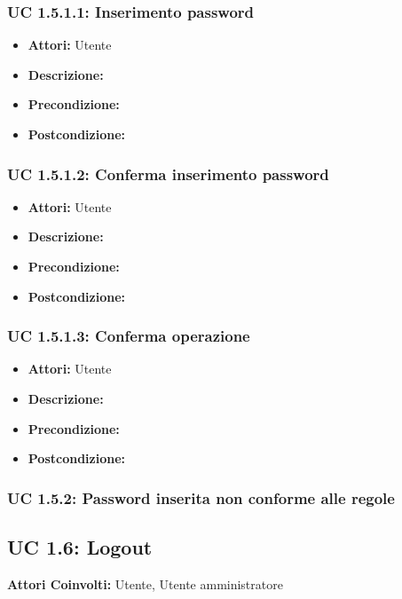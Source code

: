 \subsubsection{UC 1.5.1.1: Inserimento password}

\begin{itemize}
\item \textbf{Attori:} Utente
\item \textbf{Descrizione:} 
\item \textbf{Precondizione:} 
\item \textbf{Postcondizione:} 
\end{itemize}

\subsubsection{UC 1.5.1.2: Conferma inserimento password }

\begin{itemize}
\item \textbf{Attori:} Utente
\item \textbf{Descrizione:} 
\item \textbf{Precondizione:} 
\item \textbf{Postcondizione:} 
\end{itemize}

\subsubsection{UC 1.5.1.3: Conferma operazione}

\begin{itemize}
\item \textbf{Attori:} Utente
\item \textbf{Descrizione:} 
\item \textbf{Precondizione:} 
\item \textbf{Postcondizione:} 
\end{itemize}

\subsubsection{UC 1.5.2: Password inserita non conforme alle regole}



\subsection{UC 1.6: Logout}

\textbf{Attori Coinvolti:}
Utente, Utente amministratore

